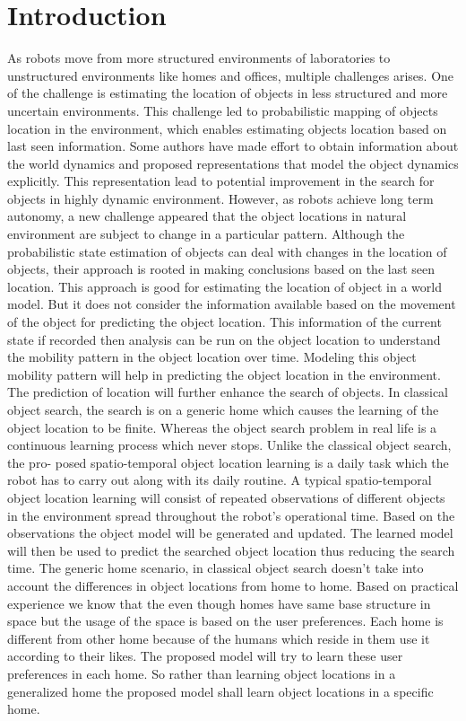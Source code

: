 \documentclass{llncs}
\begin{document}
\section{Introduction}
As robots move from more structured environments of laboratories to unstructured environments like homes and offices, multiple challenges arises. One of the challenge is
estimating the location of objects in less structured and more uncertain environments.
This challenge led to probabilistic mapping of objects location in the environment, which
enables estimating objects location based on last seen information. Some authors have
made effort to obtain information about the world dynamics and proposed representations
that model the object dynamics explicitly. This representation lead to potential improvement in the search for objects in highly dynamic environment. However, as robots achieve
long term autonomy, a new challenge appeared that the object locations in natural environment are subject to change in a particular pattern. Although the probabilistic state
estimation of objects can deal with changes in the location of objects, their approach is
rooted in making conclusions based on the last seen location. This approach is good for
estimating the location of object in a world model. But it does not consider the information available based on the movement of the object for predicting the object location.
This information of the current state if recorded then analysis can be run on the object
location to understand the mobility pattern in the object location over time. Modeling
this object mobility pattern will help in predicting the object location in the environment.
The prediction of location will further enhance the search of objects.
In classical object search, the search is on a generic home which causes the learning
of the object location to be finite. Whereas the object search problem in real life is a
continuous learning process which never stops. Unlike the classical object search, the pro-
posed spatio-temporal object location learning is a daily task which the robot has to carry
out along with its daily routine. A typical spatio-temporal object location learning will
consist of repeated observations of different objects in the environment spread throughout
the robot’s operational time. Based on the observations the object model will be generated
and updated. The learned model will then be used to predict the searched object location
thus reducing the search time.
The generic home scenario, in classical object search doesn’t take into account the
differences in object locations from home to home. Based on practical experience we know
that the even though homes have same base structure in space but the usage of the space
is based on the user preferences. Each home is different from other home because of the
humans which reside in them use it according to their likes. The proposed model will try to learn these user preferences in each home. So rather than learning object locations in
a generalized home the proposed model shall learn object locations in a specific home.
\end{document}
